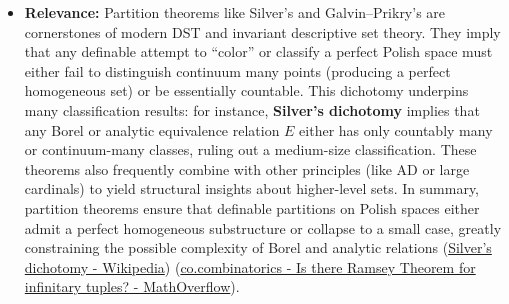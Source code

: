 \documentclass[11pt]{article}
\begin{document}
\begin{itemize}
\item \textbf{Relevance:} Partition theorems like Silver's and Galvin--Prikry's are
cornerstones of modern DST and invariant descriptive set theory. They
imply that any definable attempt to “color” or classify a perfect
Polish space must either fail to distinguish continuum many points
(producing a perfect homogeneous set) or be essentially countable.
This dichotomy underpins many classification results: for instance,
\textbf{Silver's dichotomy} implies that any Borel or analytic equivalence
relation \(E\) either has only countably many or continuum-many
classes, ruling out a medium-size classification. These theorems also
frequently combine with other principles (like AD or large cardinals)
to yield structural insights about higher-level sets. In summary,
partition theorems ensure that definable partitions on Polish spaces
either admit a perfect homogeneous substructure or collapse to a small
case, greatly constraining the possible complexity of Borel and
analytic relations
(\href{https://en.wikipedia.org/wiki/Silver\%27s\_dichotomy\#:\~:text=A\%20relation\%20is\%20said\%20to,2}{Silver's dichotomy - Wikipedia})
(\href{https://mathoverflow.net/questions/67483/is-there-ramsey-theorem-for-infinitary-tuples\#:\~:text=In\%20contrast\%2C\%20Galvin\%20and\%20Prikry,Bbb\%7BN}{co.combinatorics - Is there Ramsey Theorem for infinitary tuples? - MathOverflow}).
\end{itemize}
\end{document}
